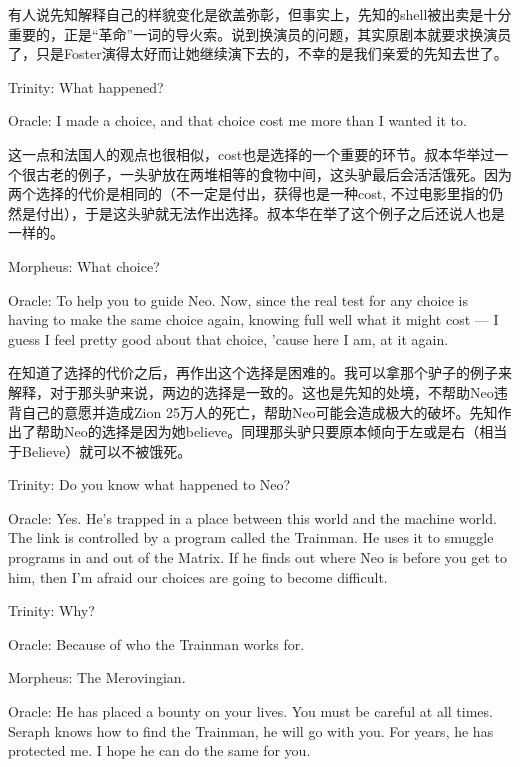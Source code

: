 \documentclass[UTF8]{ctexart}
\newenvironment{myquote}{\color{green} \setlength{\leftskip}{6em} \setlength{\rightskip}{4em} \setlength{\parindent}{-2em}}{\par}
\begin{document}
有人说先知解释自己的样貌变化是欲盖弥彰，但事实上，先知的shell被出卖是十分重要的，正是“革命”一词的导火索。说到换演员的问题，其实原剧本就要求换演员了，只是Foster演得太好而让她继续演下去的，不幸的是我们亲爱的先知去世了。

\begin{myquote}
Trinity: What happened?

Oracle: I made a choice, and that choice cost me more than I wanted it to.
\end{myquote}

这一点和法国人的观点也很相似，cost也是选择的一个重要的环节。叔本华举过一个很古老的例子，一头驴放在两堆相等的食物中间，这头驴最后会活活饿死。因为两个选择的代价是相同的（不一定是付出，获得也是一种cost, 不过电影里指的仍然是付出），于是这头驴就无法作出选择。叔本华在举了这个例子之后还说人也是一样的。

\begin{myquote}
Morpheus: What choice?

Oracle: To help you to guide Neo. Now, since the real test for any choice is having to make the same choice again, knowing full well what it might cost --- I guess I feel pretty good about that choice, 'cause here I am, at it again.
\end{myquote}

在知道了选择的代价之后，再作出这个选择是困难的。我可以拿那个驴子的例子来解释，对于那头驴来说，两边的选择是一致的。这也是先知的处境，不帮助Neo违背自己的意愿并造成Zion 25万人的死亡，帮助Neo可能会造成极大的破坏。先知作出了帮助Neo的选择是因为她believe。同理那头驴只要原本倾向于左或是右（相当于Believe）就可以不被饿死。

\begin{myquote}
Trinity: Do you know what happened to Neo?

Oracle: Yes. He's trapped in a place between this world and the machine world. The link is controlled by a program called the Trainman. He uses it to smuggle programs in and out of the Matrix. If he finds out where Neo is before you get to him, then I'm afraid our choices are going to become difficult.

Trinity: Why?

Oracle: Because of who the Trainman works for.

Morpheus: The Merovingian.

Oracle: He has placed a bounty on your lives. You must be careful at all times. Seraph knows how to find the Trainman, he will go with you. For years, he has protected me. I hope he can do the same for you.
\end{myquote}
\end{document}
